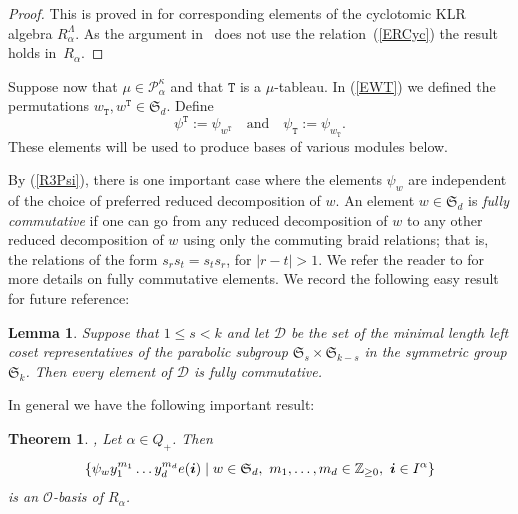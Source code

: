 \documentclass[twoside,11pt,reqno]{amsart}
\numberwithin{equation}{section}
\newtheorem{Lemma}[equation]{Lemma}
\newtheorem{Theorem}[equation]{Theorem}
\theoremstyle{definition}  %
\def\bi{\text{\boldmath$i$}}
\newcommand{\Z}{\mathbb{Z}}
\newcommand{\0}{{\bar 0}}
\newcommand{\1}{{\bar 1}}
\newcommand{\al}{\alpha}
\def\Si{\mathfrak{S}}
\newcommand{\D}{{\mathscr D}}
\newcommand\Par[1][]{{\mathscr P}^{\kappa#1}}
\def\T{{\mathtt T}}
\def\G{{\mathtt G}}
\def\Gar{{\operatorname{Gar}}}
\renewcommand\O{\mathcal O}
\begin{document}
\begin{proof} This is proved in  \cite[Proposition 2.5]{BKW} for corresponding elements of the cyclotomic KLR
  algebra $R^\Lambda_\alpha$.  As the argument in~\cite{BKW} does not use the relation~(\ref{ERCyc}) the result
  holds in~$R_\alpha$.
\end{proof}

Suppose now that $\mu\in\Par_\al$ and that $\T$ is a $\mu$-tableau. In (\ref{EWT}) we defined the permutations
$w_\T,w^\T\in\Si_d$. Define
\begin{equation}\label{EPsiT}
  \psi^\T:=\psi_{w^\T}\quad\text{and}\quad
\psi_\T:=\psi_{w_\T}.
\end{equation}
These elements will be used to produce bases of various modules below. 

By (\ref{R3Psi}), there is one important case where the elements $\psi_w$ are independent of
the choice of preferred reduced decomposition of $w$. An element $w\in\Si_d$ is {\em fully
commutative} if one can go from any reduced decomposition of $w$ to any other reduced
decomposition of $w$ using only the commuting braid relations; that is, the relations of the form
$s_rs_t=s_ts_r$, for $|r-t|>1$. We refer the reader to \cite{Stembridge} for more details on
fully commutative elements. We record the following easy result for future reference:

\begin{Lemma} \label{LFullComm}%
Suppose that $1\leq s< k$  and  let $\D$ be the set of the minimal length left coset representatives of the parabolic subgroup $\Si_s\times\Si_{k-s}$ in the symmetric group $\Si_k$. Then every element of $\D$ is fully commutative. 
\end{Lemma}


In general we have the following important result:

\begin{Theorem}\label{TBasis}{\cite[Theorem 2.5]{KL1}}, \cite[Theorem 3.7]{R} 
Let $\al\in Q_+$. Then  
$$ \{\psi_w y_1^{m_1}\dots y_d^{m_d}e(\bi)\mid w\in \Si_d,\ m_1,\dots,m_d\in\Z_{\geq 0}, \ \bi\in I^\al\}
$$ 
is an $\O$-basis of  $R_\al$. 
\end{Theorem}
\end{document}
